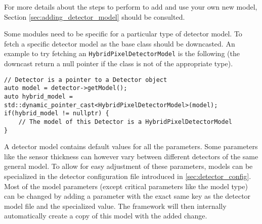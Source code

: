 
For more details about the steps to perform to add and use your own new model, Section \ref{sec:adding_detector_model} should be consulted.

Some modules need to be specific for a particular type of detector model. To fetch a specific detector model as the base class should be downcasted. An example to try fetching an \texttt{HybridPixelDetectorModel} is the following (the downcast return a null pointer if the class is not of the appropriate type).
\begin{verbatim}
// Detector is a pointer to a Detector object
auto model = detector->getModel();
auto hybrid_model = std::dynamic_pointer_cast<HybridPixelDetectorModel>(model);
if(hybrid_model != nullptr) {
    // The model of this Detector is a HybridPixelDetectorModel
}
\end{verbatim}

A detector model contains default values for all the parameters. Some parameters like the sensor thickness can however vary between different detectors of the same general model. To allow for easy adjustment of these parameters, models can be specialized in the detector configuration file introduced in \ref{sec:detector_config}. Most of the model parameters (except critical parameters like the model type) can be changed by adding a parameter with the exact same key as the detector model file and the specialized value. The framework will then internally automatically create a copy of this model with the added change. 

